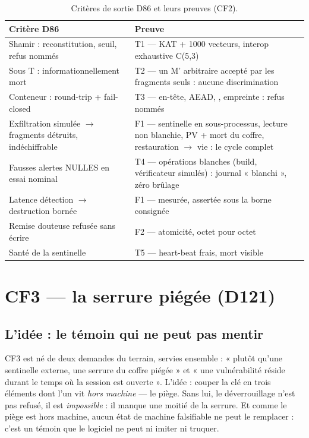 \begin{table}[htbp]
\centering\small
\caption{Critères de sortie D86 et leurs preuves (CF2).}
\label{tab:sortiecf2}
\begin{tabularx}{\textwidth}{@{}Y Y@{}}
\toprule
\textbf{Critère D86} & \textbf{Preuve} \\
\midrule
Shamir : reconstitution, seuil, refus nommés & T1 — KAT + 1000 vecteurs, interop
exhaustive C(5,3) \\
Sous T : informationnellement mort & T2 — un M' arbitraire accepté par les fragments
seuls : aucune discrimination \\
Conteneur : round-trip + fail-closed & T3 — en-tête, AEAD, , empreinte :
refus nommés \\
Exfiltration simulée $\to$ fragments détruits, indéchiffrable & F1 — sentinelle en
sous-processus, lecture non blanchie, PV + mort du coffre, restauration $\to$ vie : le
cycle complet \\
Fausses alertes NULLES en essai nominal & T4 — opérations blanches (build,
vérificateur simulés) : journal « blanchi », zéro brûlage \\
Latence détection $\to$ destruction bornée & F1 — mesurée, assertée sous la borne
consignée \\
Remise douteuse refusée sans écrire & F2 — atomicité, octet pour octet \\
Santé de la sentinelle & T5 — heart-beat frais, mort visible \\
\bottomrule
\end{tabularx}
\end{table}

\section{CF3 — la serrure piégée (D121)}\label{sec:cf3}

\subsection{L'idée : le témoin qui ne peut pas mentir}

CF3 est né de deux demandes du terrain, servies ensemble : « plutôt qu'une sentinelle
externe, une serrure du coffre piégée » et « une vulnérabilité réside durant le temps
où la session est ouverte ». L'idée : couper la clé en trois éléments dont l'un vit
\emph{hors machine} — le piège. Sans lui, le déverrouillage n'est pas refusé, il est
\emph{impossible} : il manque une moitié de la serrure. Et comme le piège est hors
machine, aucun état de machine falsifiable ne peut le remplacer : c'est un témoin que
le logiciel ne peut ni imiter ni truquer.

